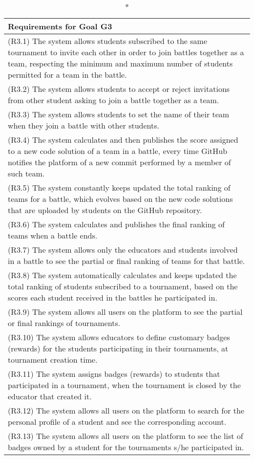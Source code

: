 \begin{longtable}{|p{16.5cm}|}
	\caption*{Requirements for Goal G3}\\
	\hline
	

(R3.1) The system allows students subscribed to the same tournament to invite each other in order to join battles together as a team, respecting the minimum and maximum number of students permitted for a team in the battle. \\
\hline
(R3.2) The system allows students to accept or reject invitations from other student asking to join a battle together as a team.\\
\hline
(R3.3) The system allows students to set the name of their team when they join a battle with other students.\\
\hline
(R3.4) The system calculates and then publishes the score assigned to a new code solution of a team in a battle, every time GitHub notifies the platform of a new commit performed by a member of such team. \\
\hline
(R3.5) The system constantly keeps updated the total ranking of teams for a battle, which evolves based on the new code solutions that are uploaded by students on the GitHub repository. \\
\hline
(R3.6) The system calculates and publishes the final ranking of teams when a battle ends. \\
\hline
(R3.7) The system allows only the educators and students involved in a battle to see the partial or final ranking of teams for that battle. \\
\hline
(R3.8) The system automatically calculates and keeps updated the total ranking of students subscribed to a tournament, based on the scores each student received in the battles he participated in. \\
\hline
(R3.9) The system allows all users on the platform to see the partial or final rankings of tournaments. \\
\hline
(R3.10)  The system allows educators to define customary badges (rewards) for the students participating in their tournaments, at tournament creation time. \\
\hline
(R3.11) The system assigns badges (rewards) to students that participated in a tournament, when the tournament is closed by the educator that created it. \\
\hline
(R3.12) The system allows all users on the platform to search for the personal profile of a student and see the corresponding account. \\
\hline
(R3.13) The system allows all users on the platform to see the list of badges owned by a student for the tournaments s/he participated in. \\
\hline

\end{longtable}
